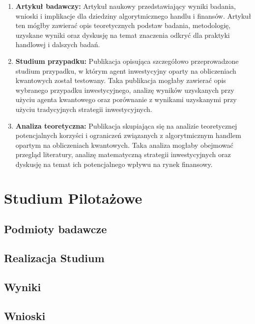 \documentclass[polish,envcountsect,10pt]{article}
\begin{document}
\begin{enumerate}
    \item \textbf{Artykuł badawczy:} Artykuł naukowy przedstawiający wyniki badania, wnioski i implikacje dla dziedziny algorytmicznego handlu i finansów. Artykuł ten mógłby zawierać opis teoretycznych podstaw badania, metodologię, uzyskane wyniki oraz dyskusję na temat znaczenia odkryć dla praktyki handlowej i dalszych badań.
    
    \item \textbf{Studium przypadku:} Publikacja opisująca szczegółowo przeprowadzone studium przypadku, w którym agent inwestycyjny oparty na obliczeniach kwantowych został testowany. Taka publikacja mogłaby zawierać opis wybranego przypadku inwestycyjnego, analizę wyników uzyskanych przy użyciu agenta kwantowego oraz porównanie z wynikami uzyskanymi przy użyciu tradycyjnych strategii inwestycyjnych.
    
    \item \textbf{Analiza teoretyczna:} Publikacja skupiająca się na analizie teoretycznej potencjalnych korzyści i ograniczeń związanych z algorytmicznym handlem opartym na obliczeniach kwantowych. Taka analiza mogłaby obejmować przegląd literatury, analizę matematyczną strategii inwestycyjnych oraz dyskusję na temat ich potencjalnego wpływu na rynek finansowy.
    
\end{enumerate}
\section{Studium Pilotażowe}

\subsection{Podmioty badawcze}

\subsection{Realizacja Studium}

\subsection{Wyniki}

\subsection{Wnioski}
\end{document}
